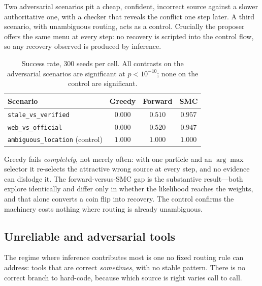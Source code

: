 \documentclass[11pt,a4paper]{article}
\begin{document}
Two adversarial scenarios pit a cheap, confident, incorrect source against a
slower authoritative one, with a checker that reveals the conflict one step
later. A third scenario, with unambiguous routing, acts as a control. Crucially
the proposer offers the same menu at every step: no recovery is scripted into
the control flow, so any recovery observed is produced by inference.

\begin{table}[h]
\centering
\begin{tabular}{@{}lccc@{}}
\toprule
\textbf{Scenario} & \textbf{Greedy} & \textbf{Forward} & \textbf{SMC} \\
\midrule
\texttt{stale\_vs\_verified}          & $0.000$ & $0.510$ & $\bm{0.957}$ \\
\texttt{web\_vs\_official}            & $0.000$ & $0.520$ & $\bm{0.947}$ \\
\texttt{ambiguous\_location} (control)& $1.000$ & $1.000$ & $1.000$ \\
\bottomrule
\end{tabular}
\caption{Success rate, $300$ seeds per cell. All contrasts on the adversarial
scenarios are significant at $p < 10^{-10}$; none on the control are
significant.}
\end{table}

Greedy fails \emph{completely}, not merely often: with one particle and an
$\arg\max$ selector it re-selects the attractive wrong source at every step,
and no evidence can dislodge it. The forward-versus-SMC gap is the substantive
result---both explore identically and differ only in whether the likelihood
reaches the weights, and that alone converts a coin flip into recovery. The
control confirms the machinery costs nothing where routing is already
unambiguous.

\subsection{Unreliable and adversarial tools}

The regime where inference contributes most is one no fixed routing rule can
address: tools that are correct \emph{sometimes}, with no stable pattern. There
is no correct branch to hard-code, because which source is right varies call to
call.
\end{document}
